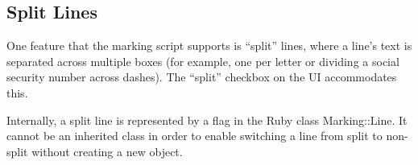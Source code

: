 \subsection{Split Lines}

One feature that the marking script supports is ``split'' lines, where a line's
text is separated across multiple boxes (for example, one per letter or dividing
a social security number across dashes). The ``split'' checkbox on the UI
accommodates this.

Internally, a split line is represented by a flag in the Ruby class
Marking::Line. It cannot be an inherited class in order to enable switching
a line from split to non-split without creating a new object.




